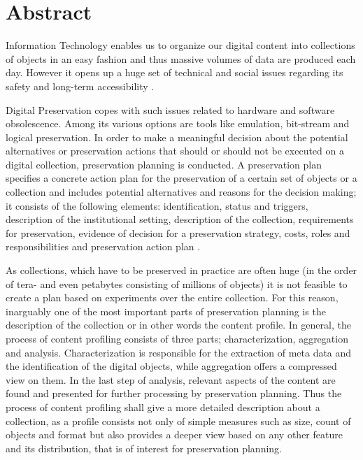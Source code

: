 \chapter*{Abstract}
Information Technology enables us to organize our digital content into collections of objects in an easy fashion and thus massive volumes of data are produced each day.
However it opens up a huge set of technical and social issues regarding its safety and long-term accessibility \cite{Lorie:2001:LTP:379437.379726}.

Digital Preservation copes with such issues related to hardware and software obsolescence. Among its various
options are tools like emulation, bit-stream and logical preservation. In order to make a meaningful decision
about the potential alternatives or preservation actions that should or should not be executed on a
digital collection, preservation planning is conducted. A preservation plan specifies a concrete action plan for the preservation
of a certain set of objects or a collection and includes potential alternatives and reasons for the decision making; it
consists of the following elements: identification, status and triggers, description of the institutional setting, description of the collection, requirements for preservation, evidence of decision for a preservation strategy, costs, roles and responsibilities and preservation action plan \cite{Becker:2009fk}. 

As collections, which have to be preserved in practice are often huge (in the order of tera- and even petabytes consisting of millions of objects) it is not feasible to create a plan based on experiments over the entire collection. For this reason, inarguably one of the most important parts of preservation planning is the description of the collection or in other words the content profile. In general, the process of content profiling consists of three parts; characterization, aggregation and analysis. Characterization is responsible for the extraction of meta data and the identification of the digital objects, while aggregation offers a compressed view on them. In the last step of analysis, relevant aspects of the content are found and presented for further processing by preservation planning. Thus the process of content profiling shall give a more detailed description about a collection, as a profile consists not only of simple measures such as size, count of objects and format but also provides a deeper view based on any other feature and its distribution, that is of interest for preservation planning.

